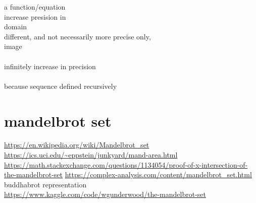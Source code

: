 a function/equation\\
increase presision in\\
domain\\
different, and not necessarily more precise only,\\
image\\
\\
infinitely increase in precision\\
\\
because sequence defined recursively\\

\chapter{mandelbrot set}
\url{https://en.wikipedia.org/wiki/Mandelbrot_set}
\url{https://ics.uci.edu/~eppstein/junkyard/mand-area.html}
\url{https://math.stackexchange.com/questions/1134054/proof-of-x-intersection-of-the-mandelbrot-set}
\url{https://complex-analysis.com/content/mandelbrot_set.html}
\\
\noindent buddhabrot representation\\
\url{https://www.kaggle.com/code/wgunderwood/the-mandelbrot-set}\\
